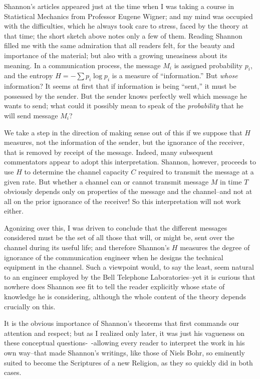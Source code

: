 Shannon's articles appeared just at the time when I was taking a course in Statistical Mechanics from Professor Eugene Wigner; and my mind was occupied with the difficulties, which he always took care to stress, faced by the theory at that time; the short sketch above notes only a few of them.
Reading Shannon filled me with the same admiration that all readers felt, for the beauty and importance of the material; but also with a growing uneasiness about its meaning.
In a communication process, the message $M_i$ is assigned probability $p_i$, and the entropy $H=-\sum p_i \log p_i$ is a measure of ``information.''
But \emph{whose} information?
It seems at first that if information is being ``sent,'' it must be possessed by the sender.
But the sender knows perfectly well which message he wants to send; what could it possibly mean to speak of the \emph{probability} that he will send message $M_i$?

We take a step in the direction of making sense out of this if we suppose that $H$ measures, not the information of the sender, but the ignorance of the receiver, that is removed by receipt of the message.
Indeed, many subsequent commentators appear to adopt this interpretation.
Shannon, however, proceeds to use $H$ to determine the channel capacity $C$ required to transmit the message at a given rate.
But whether a channel can or cannot transmit message $M$ in time $T$ obviously depends only on properties of the message and the channel--and not at all on the prior ignorance of the receiver!
So this interpretation will not work either.

Agonizing over this, I was driven to conclude that the different messages considered must be the set of all those that will, or might be, sent over the channel during its useful life; and therefore Shannon's $H$ measures the degree of ignorance of the communication engineer when he designs the technical equipment in the channel.
Such a viewpoint would, to say the least, seem natural to an engineer employed by the Bell Telephone Laboratories--yet it is curious that nowhere does Shannon see fit to tell the reader explicitly whose state of knowledge he is considering, although the whole content of the theory depends crucially on this.

It is the obvious importance of Shannon's theorems that first commands our attention and respect; but as I realized only later, it was just his vagueness on these conceptual questions-~-allowing every reader to interpret the work in his own way--that made Shannon's writings, like those of Niels Bohr, so eminently suited to become the Scriptures of a new Religion, as they so quickly did in both cases.

